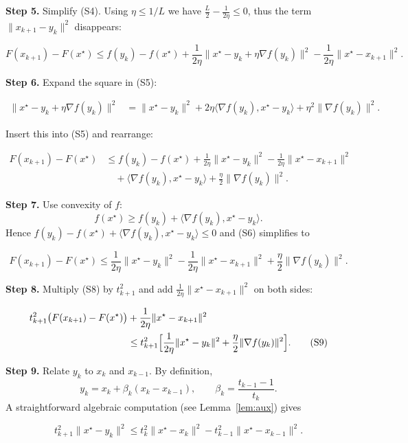 \documentclass{article}
\begin{document}
\noindent\textbf{Step 5.} Simplify (S4).  Using $\eta\le 1/L$ we have $\frac{L}{2}-\frac{1}{2\eta}\le0$, thus the term $\|x_{k+1}-y_k\|^{2}$ disappears:

\[
F(x_{k+1})-F(x^\star)
\le f(y_k)-f(x^\star)
   +\frac{1}{2\eta}\bigl\|x^\star-y_k+\eta\nabla f(y_k)\bigr\|^{2}
   -\frac{1}{2\eta}\|x^\star-x_{k+1}\|^{2}. \tag{S5}
\]

\noindent\textbf{Step 6.} Expand the square in (S5):

\[
\begin{aligned}
\bigl\|x^\star-y_k+\eta\nabla f(y_k)\bigr\|^{2}
&=\|x^\star-y_k\|^{2}+2\eta\langle\nabla f(y_k),x^\star-y_k\rangle+\eta^{2}\|\nabla f(y_k)\|^{2}.
\end{aligned}
\]

Insert this into (S5) and rearrange:

\[
\begin{aligned}
F(x_{k+1})-F(x^\star)
&\le f(y_k)-f(x^\star)+\frac{1}{2\eta}\|x^\star-y_k\|^{2}
   -\frac{1}{2\eta}\|x^\star-x_{k+1}\|^{2}\\
&\quad+\langle\nabla f(y_k),x^\star-y_k\rangle+\frac{\eta}{2}\|\nabla f(y_k)\|^{2}. \tag{S6}
\end{aligned}
\]

\noindent\textbf{Step 7.} Use convexity of $f$:
\[
f(x^\star)\ge f(y_k)+\langle\nabla f(y_k),x^\star-y_k\rangle. \tag{S7}
\]
Hence $f(y_k)-f(x^\star)+\langle\nabla f(y_k),x^\star-y_k\rangle\le0$ and (S6) simplifies to

\[
F(x_{k+1})-F(x^\star)
\le \frac{1}{2\eta}\|x^\star-y_k\|^{2}
   -\frac{1}{2\eta}\|x^\star-x_{k+1}\|^{2}
   +\frac{\eta}{2}\|\nabla f(y_k)\|^{2}. \tag{S8}
\]

\noindent\textbf{Step 8.} Multiply (S8) by $t_{k+1}^{2}$ and add $\frac{1}{2\eta}\|x^\star-x_{k+1}\|^{2}$ on both sides:

\[
\begin{aligned}
t_{k+1}^{2}\bigl(F(x_{k+1})-F(x^\star)\bigr)
&+\frac{1}{2\eta}\|x^\star-x_{k+1}\|^{2} \\
&\le t_{k+1}^{2}\Bigl[\frac{1}{2\eta}\|x^\star-y_k\|^{2}
   +\frac{\eta}{2}\|\nabla f(y_k)\|^{2}\Bigr]. \tag{S9}
\end{aligned}
\]

\noindent\textbf{Step 9.} Relate $y_k$ to $x_k$ and $x_{k-1}$.  By definition,
\[
y_k = x_k + \beta_k (x_k-x_{k-1}),\qquad
\beta_k = \frac{t_{k-1}-1}{t_k}. \tag{S10}
\]
A straightforward algebraic computation (see Lemma~\ref{lem:aux}) gives

\[
t_{k+1}^{2}\|x^\star-y_k\|^{2}
\le t_k^{2}\|x^\star-x_k\|^{2}
      - t_{k-1}^{2}\|x^\star-x_{k-1}\|^{2}. \tag{S11}
\]
\end{document}

